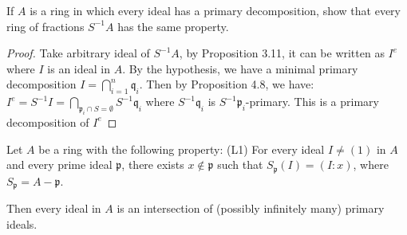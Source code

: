 \documentclass{solution}
\begin{document}
\begin{problem}
    If $A$ is a ring in which every ideal has a primary decomposition, show that every ring of fractions $S ^{-1} A$ has the same property.
\end{problem}

\begin{proof}
    Take arbitrary ideal of $S ^{-1} A$, by Proposition 3.11, it can be written as $I^e$ where $I$ is an ideal in $A$. By the hypothesis, we have a minimal primary decomposition $I = \bigcap\limits_{i = 1}^{n} \mathfrak{q}_i$. Then by Proposition 4.8, we have: $I^e = S ^{-1} I = \bigcap\limits_{\mathfrak{p}_i \cap S = \emptyset} S ^{-1} \mathfrak{q}_i$ where $S ^{-1} \mathfrak{q}_i$ is $S ^{-1} \mathfrak{p}_i$-primary. This is a primary decomposition of $I^e$
\end{proof}

\begin{problem}
    Let $A$ be a ring with the following property: (L1) For every ideal $I \ne (1)$ in $A$ and every prime ideal $\mathfrak{p}$, there exists $x \notin \mathfrak{p}$ such that $S_{\mathfrak{p}}(I) = (I : x)$, where $S_{\mathfrak{p}} = A - \mathfrak{p}$.

    Then every ideal in $A$ is an intersection of (possibly infinitely many) primary ideals.
\end{problem}
\end{document}
